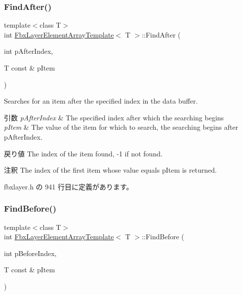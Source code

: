 \subsubsection{\texorpdfstring{Find\+After()}{FindAfter()}}
{\footnotesize\ttfamily template$<$class T$>$ \\
int \hyperlink{class_fbx_layer_element_array_template}{Fbx\+Layer\+Element\+Array\+Template}$<$ T $>$\+::Find\+After (\begin{DoxyParamCaption}\item[{int}]{p\+After\+Index,  }\item[{T const \&}]{p\+Item }\end{DoxyParamCaption})\hspace{0.3cm}{\ttfamily [inline]}}

Searches for an item after the specified index in the data buffer. 
\begin{DoxyParams}{引数}
{\em p\+After\+Index} & The specified index after which the searching begins \\
\hline
{\em p\+Item} & The value of the item for which to search, the searching begins after p\+After\+Index. \\
\hline
\end{DoxyParams}
\begin{DoxyReturn}{戻り値}
The index of the item found, -\/1 if not found. 
\end{DoxyReturn}
\begin{DoxyRemark}{注釈}
The index of the first item whose value equals p\+Item is returned. 
\end{DoxyRemark}


 fbxlayer.\+h の 941 行目に定義があります。

\mbox{\label{class_fbx_layer_element_array_template_a27a66a52ff1642fd6a5ed7c34d72c3c7}} 
\subsubsection{\texorpdfstring{Find\+Before()}{FindBefore()}}
{\footnotesize\ttfamily template$<$class T$>$ \\
int \hyperlink{class_fbx_layer_element_array_template}{Fbx\+Layer\+Element\+Array\+Template}$<$ T $>$\+::Find\+Before (\begin{DoxyParamCaption}\item[{int}]{p\+Before\+Index,  }\item[{T const \&}]{p\+Item }\end{DoxyParamCaption})\hspace{0.3cm}{\ttfamily [inline]}}

